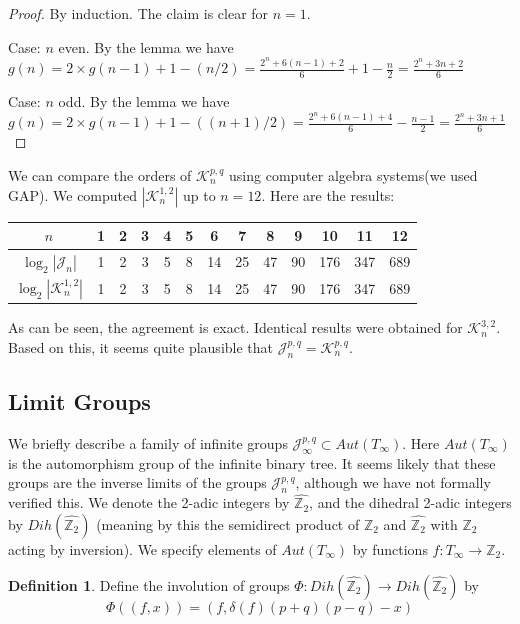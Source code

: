 \documentclass[11pt]{article}
\theoremstyle{plain}
\theoremstyle{definition}
\newtheorem{definition}{Definition}
\begin{document}
\begin{proof} By induction. The claim is clear for $n = 1$. 

Case: $n$ even. By the lemma we have $g(n) = 2 \times g(n-1)+1-(n/2) = \frac{2^n + 6(n-1) + 2}{6} + 1 - \frac{n}{2} = \frac{2^n + 3n + 2}{6}$

Case: $n$ odd. By the lemma we have $g(n) = 2 \times g(n-1) + 1 - ((n+1)/2) = \frac{2^n + 6(n-1) + 4}{6} - \frac{n-1}{2} = \frac{2^n + 3n + 1}{6}$
    
\end{proof}

We can compare the orders of $\mathcal{K}_n^{p,q}$ using computer algebra systems(we used GAP). We computed $|\mathcal{K}_n^{1,2}|$ up to $n=12$. Here are the results:

\vspace{1em}
\begin{tabular}{| c c c c c c c c c c c c c |}
\hline
$n$ & 1 & 2 & 3 & 4 & 5 & 6 & 7 & 8 & 9 & 10 & 11 & 12 \\
\hline
$\log_2|\mathcal{J}_n|$ & 1 & 2 & 3 & 5 & 8 & 14 & 25 & 47 & 90 & 176 & 347 & 689 \\
\hline
$\log_2|\mathcal{K}_n^{1,2}|$ & 1 & 2 & 3 & 5 & 8 & 14 & 25 & 47 & 90 & 176 & 347 & 689 \\
\hline
\end{tabular}

As can be seen, the agreement is exact. Identical results were obtained for $\mathcal{K}_n^{3,2}$. Based on this, it seems quite plausible that $\mathcal{J}_n^{p,q} = \mathcal{K}_n^{p,q}$.


\subsection{Limit Groups}

We briefly describe a family of infinite groups $\mathcal{J}_\infty^{p,q} \subset Aut(T_\infty)$. Here $Aut(T_\infty)$ is the automorphism group of the infinite binary tree.
It seems likely that these groups are the inverse limits of the groups $\mathcal{J}_n^{p,q}$, although we have not formally verified this. We denote the 2-adic integers by $\widehat{\mathbb{Z}_2}$, and the dihedral 2-adic integers by $Dih(\widehat{\mathbb{Z}_2})$ (meaning by this the semidirect product of $\mathbb{Z}_2$ and $\widehat{\mathbb{Z}_2}$ with $\mathbb{Z}_2$ acting by inversion). We specify elements of $Aut(T_\infty)$ by functions $f:T_\infty \rightarrow\mathbb{Z}_2$.

\begin{definition}
    Define the involution of groups 
    $\Phi:Dih(\widehat{\mathbb{Z}_2}) \rightarrow Dih(\widehat{\mathbb{Z}_2})$
    by 
    $$\Phi((f, x)) = (f, \delta(f) (p+q)(p-q) - x)$$
\end{definition}
\end{document}

